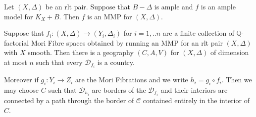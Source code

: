 	\begin{lemma}\cite[Lemma 3.6]{hacon2009sarkisov}\label{amp}
		Let $(X,\Delta)$ be an rlt pair. Suppose that $B-\Delta$ is ample and $f$ is an ample model for $K_{X}+B$. Then $f$ is an MMP for $(X,\Delta)$.
	\end{lemma}
\begin{lemma}\label{geo}
	Suppose that $f_{i}: (X,\Delta) \to (Y_{i},\Delta_{i})$ for $i=1,..n$ are a finite collection of $\mathbb{Q}$-factorial Mori Fibre spaces obtained by running an MMP for an rlt pair $(X,\Delta)$ with $X$ smooth. Then there is a geography $(C,A,V)$ for $(X,\Delta)$ of dimension at most $n$ such that every $\mathcal{D}_{f_{i}}$ is a country. 
	
	Moreover if $g_{i}:Y_{i}\to Z_{i}$ are the Mori Fibrations and we write $h_{i}=g_{i}\circ f_{i}$. Then we may choose $C$ such that $\mathcal{D}_{h_{i}}$ are borders of the $\mathcal{D}_{f_{i}}$ and their interiors are connected by a path through the border of $\mathcal{C}$ contained entirely in the interior of $C$.
\end{lemma}


